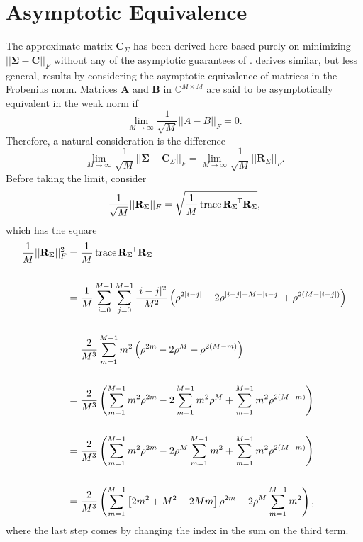 \documentclass[letterpaper,12pt,oneside,final]{article}
\newcommand{\m}[1]{\mathbf{#1}}               %
\newcommand{\sm}[1]{\boldsymbol{#1}}   %
\newcommand{\tr}[1]{{#1}^{\mkern-1.5mu\mathsf{T}}}              %
\newcommand{\norm}[1]{||{#1}||}              %
\newcommand{\frob}[1]{\norm{#1}_F}
\newcommand{\abs}[1]{\lvert{#1}\rvert}              %
\newcommand*{\trace}{\operatorname{trace}}
\newcommand{\field}[1]{\mathbb{#1}}
\newcommand{\Complex}{\field{C}}
\begin{document}
\section{Asymptotic Equivalence} \label{c:multipleTesting:asympEquiv}

The approximate matrix $\m{C}_{\Sigma}$ has been derived here based purely on minimizing $\frob{\sm{\Sigma} - \m{C}}$ without any of the asymptotic guarantees of \cite{grenanderszego1958}. \cite{gray2006toeplitz} derives similar, but less general, results by considering the asymptotic equivalence of matrices in the Frobenius norm. Matrices $\m{A}$ and $\m{B}$ in $\Complex^{M \times M}$ are said to be asymptotically equivalent in the weak norm if
$$\lim_{M \rightarrow \infty} \frac{1}{\sqrt{M}} \frob{A - B} = 0.$$
Therefore, a natural consideration is the difference
\begin{equation} \label{eq:multipleTesting:asympEq}
  \lim_{M \rightarrow \infty} \frac{1}{\sqrt{M}} \frob{\sm{\Sigma} - \m{C}_{\Sigma}} = \lim_{M \rightarrow \infty} \frac{1}{\sqrt{M}} \frob{\m{R}_{\Sigma}}.
\end{equation}
Before taking the limit, consider
$$\frac{1}{\sqrt{M}} \frob{\m{R}_{\Sigma}} =  \sqrt{ \frac{1}{M} \trace{\tr{\m{R}_{\Sigma}} \m{R}_{\Sigma}} },$$
which has the square
\begin{equation} \label{eq:multipleTesting:asymTrace}
  \begin{aligned}
    \frac{1}{M} \frob{\m{R}_{\Sigma}}^2 & =  \frac{1}{M} \trace{\tr{\m{R}_{\Sigma}} \m{R}_{\Sigma}} \\
    & \\
    & = \frac{1}{M} \sum_{i = 0}^{M-1} \sum_{j = 0}^{M-1} \frac{\abs{i-j}^2}{M^2} \left ( \rho^{2\abs{i-j}} - 2 \rho^{\abs{i-j} + M - \abs{i-j}} + \rho^{2(M - \abs{i-j})} \right ) \\
    & \\
    & =  \frac{2}{M^3} \sum_{m = 1}^{M-1} m^2 \left ( \rho^{2m} - 2 \rho^{M} + \rho^{2(M - m)} \right ) \\
    & \\
    & =  \frac{2}{M^3} \left ( \sum_{m = 1}^{M-1} m^2 \rho^{2m} - 2 \sum_{m = 1}^{M-1} m^2 \rho^M + \sum_{m = 1}^{M-1} m^2 \rho^{2(M-m)} \right ) \\
    & \\
    & = \frac{2}{M^3} \left ( \sum_{m = 1}^{M-1} m^2 \rho^{2m} - 2\rho^M \sum_{m = 1}^{M-1} m^2 + \sum_{m = 1}^{M-1} m^2 \rho^{2(M-m)} \right ) \\
    & \\
    & =  \frac{2}{M^3} \left ( \sum_{m = 1}^{M-1} \left [ 2m^2 + M^2 - 2Mm \right ] \rho^{2m} -  2 \rho^M \sum_{m = 1}^{M-1} m^2 \right ),
  \end{aligned}
\end{equation}
where the last step comes by changing the index in the sum on the third term.
\end{document}
